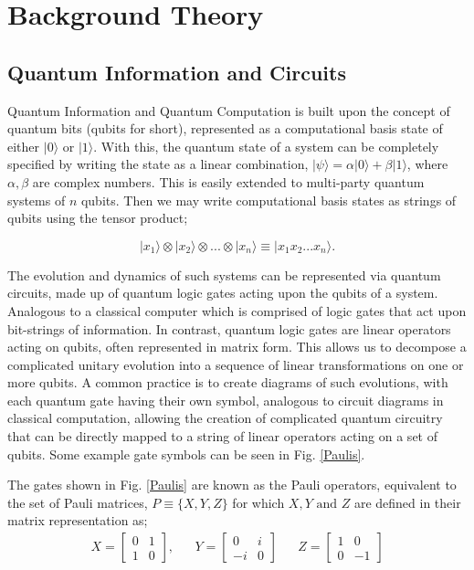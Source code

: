 \section{Background Theory}
\subsection{Quantum Information and Circuits}
\vspace{-0.15in}
Quantum Information and Quantum Computation is built upon the concept of quantum bits (qubits for short),
represented as a computational basis state of either $|0\rangle$ or $|1\rangle$. With this, the
quantum state of a system can be completely specified by writing the state as a linear combination,
$|\psi\rangle = \alpha |0\rangle + \beta |1\rangle$, where $\alpha, \beta$ are complex numbers.
This is easily extended to multi-party quantum systems of $n$ qubits. Then we may write computational
basis states as strings of qubits using the tensor product;

\[|x_1\rangle \otimes |x_2\rangle \otimes ... \otimes |x_n\rangle \equiv |x_1 x_2... x_n \rangle. \]

The evolution and dynamics of such systems can be represented via quantum circuits, made up of quantum logic gates acting
upon the qubits of a system. Analogous to a classical computer which is comprised of logic gates that act upon
bit-strings of information. In contrast, quantum logic gates are linear operators acting 
on qubits, often represented in matrix form. This allows us to decompose a complicated unitary evolution into a 
sequence of linear transformations on one or more qubits. A common practice is to create 
diagrams of such evolutions, with each quantum gate having their own symbol, analogous to circuit diagrams in classical
computation, allowing the creation of complicated quantum circuitry that can be directly mapped to a string of linear 
operators acting on a set of qubits. Some example gate symbols can be seen in Fig. \ref{Paulis}. 




The gates shown in Fig. \ref{Paulis} are known as the Pauli operators, equivalent 
to the set of Pauli matrices, $P \equiv \{X, Y, Z\}$ for which $X, Y \text{ and } Z$ are defined in their matrix representation as;
\begin{align*}
    X = \begin{bmatrix}
            0 & 1 \\
            1 & 0
        \end{bmatrix},
     &  &
    Y = \begin{bmatrix}
            0  & i \\
            -i & 0
        \end{bmatrix}
     &  &
    Z = \begin{bmatrix}
            1 & 0  \\
            0 & -1
        \end{bmatrix}
\end{align*}

